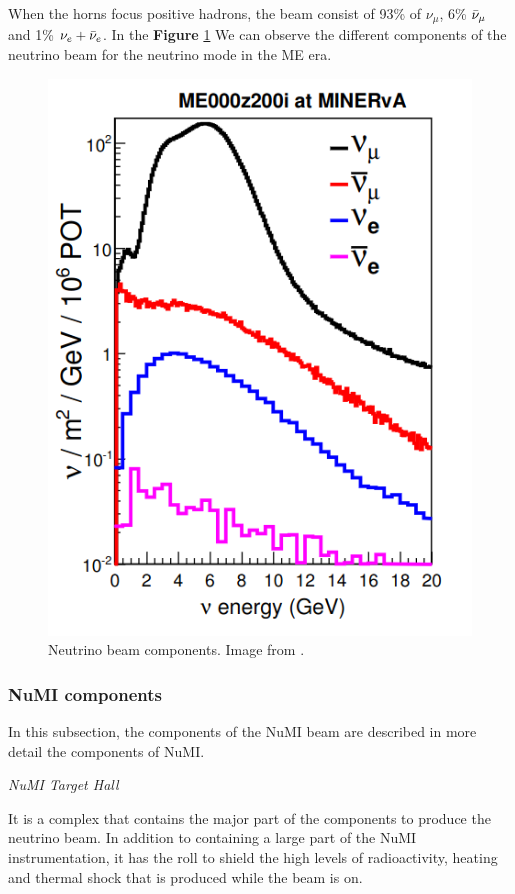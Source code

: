When the horns focus positive hadrons, the beam consist of 93\% of $\nu_\mu$, 6\% $\Bar{\nu}_\mu$ and 1\% $\nu_e + \Bar{\nu}_e$. In the \textbf{Figure} \ref{fig:MnvExp:NuMI:NuMIBeamComponents} We can observe the different components of the neutrino beam for the neutrino mode in the ME era. 
\begin{figure}[!htb]
\centering
\includegraphics[scale=0.4]{Figures/Chapter2/NuMIbeamComponents.png}
        \caption{Neutrino beam components. Image from \cite{LeoThesis}.} 
\label{fig:MnvExp:NuMI:NuMIBeamComponents}
\end{figure}


\subsubsection{NuMI components}
In this subsection, the components of the NuMI beam are described in more detail the components of NuMI.

\textit{NuMI Target Hall}

It is a complex that contains the major part of the components to produce the neutrino beam. In addition to containing a large part of the NuMI instrumentation, it has the roll to shield the high levels of radioactivity, heating and thermal shock that is produced while the beam is on.  

